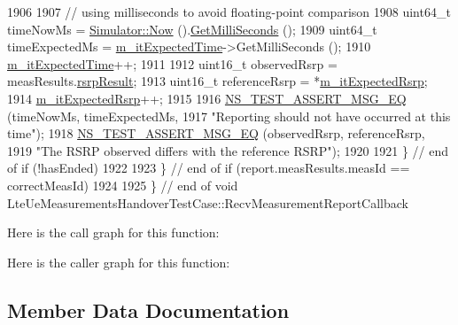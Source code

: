 \begin{DoxyCode}
1906 
1907           \textcolor{comment}{// using milliseconds to avoid floating-point comparison}
1908           uint64\_t timeNowMs = \hyperlink{group__simulator_gac3635e2e87f7ce316c89290ee1b01d0d}{Simulator::Now} ().\hyperlink{classns3_1_1Time_aba3428a8b6c4c8d9014ce44145081f34}{GetMilliSeconds} ();
1909           uint64\_t timeExpectedMs = \hyperlink{classLteUeMeasurementsHandoverTestCase_a95dfbfd7799a6d05744eb034fc490bb3}{m\_itExpectedTime}->GetMilliSeconds ();
1910           \hyperlink{classLteUeMeasurementsHandoverTestCase_a95dfbfd7799a6d05744eb034fc490bb3}{m\_itExpectedTime}++;
1911 
1912           uint16\_t observedRsrp = measResults.\hyperlink{structns3_1_1LteRrcSap_1_1MeasResults_a4d7bf8765525493fe5f5cccdbf94ab8b}{rsrpResult};
1913           uint16\_t referenceRsrp = *\hyperlink{classLteUeMeasurementsHandoverTestCase_a3536cc572e685490dd4e4fde364f39a3}{m\_itExpectedRsrp};
1914           \hyperlink{classLteUeMeasurementsHandoverTestCase_a3536cc572e685490dd4e4fde364f39a3}{m\_itExpectedRsrp}++;
1915 
1916           \hyperlink{group__testing_ga2a9d78cffb3db8e867c35fff0b698cf5}{NS\_TEST\_ASSERT\_MSG\_EQ} (timeNowMs, timeExpectedMs,
1917                                  \textcolor{stringliteral}{"Reporting should not have occurred at this time"});
1918           \hyperlink{group__testing_ga2a9d78cffb3db8e867c35fff0b698cf5}{NS\_TEST\_ASSERT\_MSG\_EQ} (observedRsrp, referenceRsrp,
1919                                  \textcolor{stringliteral}{"The RSRP observed differs with the reference RSRP"});
1920 
1921         \} \textcolor{comment}{// end of if (!hasEnded)}
1922 
1923     \} \textcolor{comment}{// end of if (report.measResults.measId == correctMeasId)}
1924 
1925 \} \textcolor{comment}{// end of void LteUeMeasurementsHandoverTestCase::RecvMeasurementReportCallback}
\end{DoxyCode}


Here is the call graph for this function\+:




Here is the caller graph for this function\+:




\subsection{Member Data Documentation}
